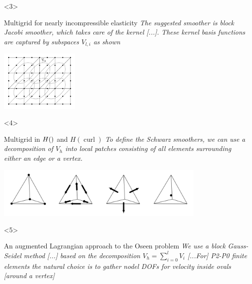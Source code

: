 \documentclass[presentation,aspectratio=43, 10pt]{beamer}
\let\div\relax
\DeclareMathOperator{\div}{div}
\DeclareMathOperator{\curl}{curl}
\begin{document}
\begin{frame}[t]
  \begin{onlyenv}<3>
    \begin{block}{Multigrid for nearly incompressible elasticity}
      \emph{The suggested smoother is block Jacobi smoother, which takes
      care of the kernel [...]. These kernel basis functions are
      captured by subspaces $V_{l,i}$ as shown}
      \begin{center}
        \includegraphics[height=3cm]{schoeberl}
      \end{center}
      \begin{flushright}
        \textcite{Schoeberl:1999} \hspace{4em}
      \end{flushright}
    \end{block}
  \end{onlyenv}

  \begin{onlyenv}<4>
    \begin{block}{Multigrid in $H(\div)$ and $H(\curl)$}
      \emph{To define the Schwarz smoothers, we can use a decomposition of
      $V_h$ into local patches consisting of all elements surrounding
      either an edge or a vertex.}

      \begin{center}
        \includegraphics[height=2.5cm]{arnold}
      \end{center}
      \begin{flushright}
        \textcite{Arnold:2000} \hspace{4em}
      \end{flushright}
    \end{block}
  \end{onlyenv}

  \begin{onlyenv}<5>
    \begin{block}{An augmented Lagrangian approach to the Oseen problem}
      \emph{We use a block Gauss-Seidel method [...] based on the
      decomposition $V_h = \sum_{i=0}^l V_i$ [...For] P2-P0 finite
      elements the natural choice is to gather nodel DOFs for velocity
      inside ovals [around a vertex]}


\end{block}
\end{onlyenv}
\end{frame}
\end{document}
